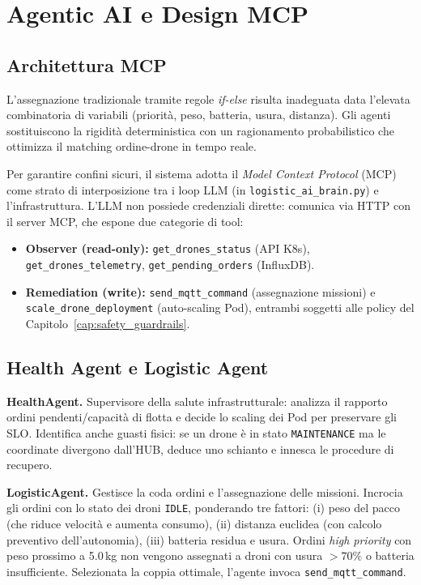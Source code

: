 
\chapter{Agentic AI e Design MCP}
\label{cap:agentic_operations_mcp}

\section{Architettura MCP}
\label{sec:architettura_mcp}

L'assegnazione tradizionale tramite regole \textit{if-else} risulta inadeguata data l'elevata combinatoria di variabili (priorità, peso, batteria, usura, distanza). Gli agenti sostituiscono la rigidità deterministica con un ragionamento probabilistico che ottimizza il matching ordine-drone in tempo reale.

Per garantire confini sicuri, il sistema adotta il \textit{Model Context Protocol} (MCP) come strato di interposizione tra i loop LLM (in \texttt{logistic\_ai\_brain.py}) e l'infrastruttura. L'LLM non possiede credenziali dirette: comunica via HTTP con il server MCP, che espone due categorie di tool:
\begin{itemize}
    \item \textbf{Observer (read-only):} \texttt{get\_drones\_status} (API K8s), \texttt{get\_drones\_telemetry}, \texttt{get\_pending\_orders} (InfluxDB).
    \item \textbf{Remediation (write):} \texttt{send\_mqtt\_command} (assegnazione missioni) e \texttt{scale\_drone\_deployment} (auto-scaling Pod), entrambi soggetti alle policy del Capitolo~\ref{cap:safety_guardrails}.
\end{itemize}

\section{Health Agent e Logistic Agent}
\label{sec:agenti}

\textbf{HealthAgent.} Supervisore della salute infrastrutturale: analizza il rapporto ordini pendenti/capacità di flotta e decide lo scaling dei Pod per preservare gli SLO. Identifica anche guasti fisici: se un drone è in stato \texttt{MAINTENANCE} ma le coordinate divergono dall'HUB, deduce uno schianto e innesca le procedure di recupero.

\textbf{LogisticAgent.} Gestisce la coda ordini e l'assegnazione delle missioni. Incrocia gli ordini con lo stato dei droni \texttt{IDLE}, ponderando tre fattori: (i) peso del pacco (che riduce velocità e aumenta consumo), (ii) distanza euclidea (con calcolo preventivo dell'autonomia), (iii) batteria residua e usura. Ordini \textit{high priority} con peso prossimo a 5.0\,kg non vengono assegnati a droni con usura $>70\%$ o batteria insufficiente. Selezionata la coppia ottimale, l'agente invoca \texttt{send\_mqtt\_command}.

